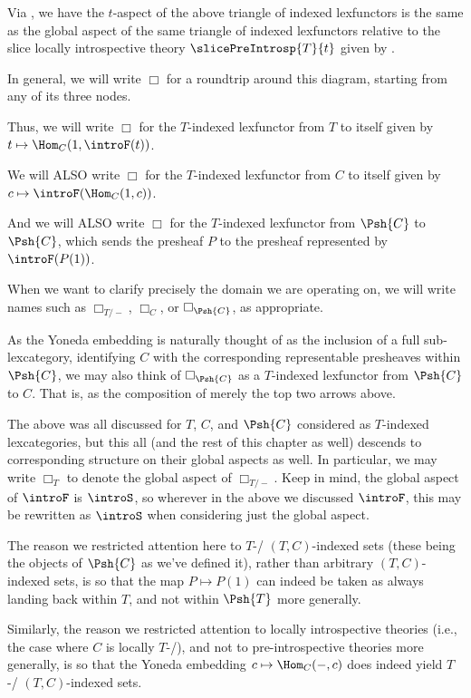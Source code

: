 \begin{observation}\label{SliceBoxIsAspectBox}
Via , we have the $t$-aspect of the above triangle of indexed lexfunctors is the same as the global aspect of the same triangle of indexed lexfunctors relative to the slice locally introspective theory $\slicePreIntrosp{T}{t}$ given by . 
\end{observation}

\begin{definition}\label{BoxDefn}
In general, we will write $\Box$ for a roundtrip around this diagram, starting from any of its three nodes.

Thus, we will write $\Box$ for the $T$-indexed lexfunctor from $T$ to itself given by $t \mapsto \Hom_C(1, \introF(t))$.

We will ALSO write $\Box$ for the $T$-indexed lexfunctor from $C$ to itself given by $c \mapsto \introF(\Hom_C(1, c))$.

And we will ALSO write $\Box$ for the $T$-indexed lexfunctor from $\Psh{C}$ to $\Psh{C}$, which sends the presheaf $P$ to the presheaf represented by $\introF(P(1))$.

When we want to clarify precisely the domain we are operating on, we will write names such as $\Box_{T/-}$, $\Box_C$, or $\Box_{\Psh{C}}$, as appropriate.

As the Yoneda embedding is naturally thought of as the inclusion of a full sub-lexcategory, identifying $C$ with the corresponding representable presheaves within $\Psh{C}$, we may also think of $\Box_{\Psh{C}}$ as a $T$-indexed lexfunctor from $\Psh{C}$ to $C$. That is, as the composition of merely the top two arrows above.
\end{definition}

The above was all discussed for $T$, $C$, and $\Psh{C}$ considered as $T$-indexed lexcategories, but this all (and the rest of this chapter as well) descends to corresponding structure on their global aspects as well. In particular, we may write $\Box_{T}$ to denote the global aspect of $\Box_{T/-}$. Keep in mind, the global aspect of $\introF$ is $\introS$, so wherever in the above we discussed $\introF$, this may be rewritten as $\introS$ when considering just the global aspect.

\bigskip
\begin{remark}\label{BoxNotationSmallnessConcerns}
The reason we restricted attention here to $T$-\repsmall/ $(T, C)$-indexed sets (these being the objects of $\Psh{C}$ as we've defined it), rather than arbitrary $(T, C)$-indexed sets, is so that the map $P \mapsto P(1)$ can indeed be taken as always landing back within $T$, and not within $\Psh{T}$ more generally.

Similarly, the reason we restricted attention to locally introspective theories (i.e., the case where $C$ is locally $T$-\repsmall/), and not to pre-introspective theories more generally, is so that the Yoneda embedding $c \mapsto \Hom_C(-, c)$ does indeed yield $T$-\repsmall/ $(T, C)$-indexed sets.
\end{remark}

